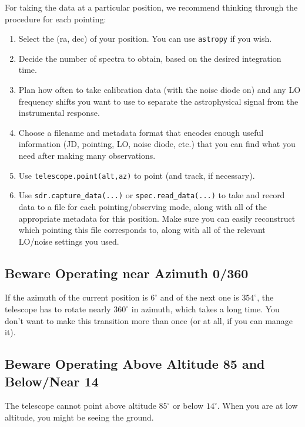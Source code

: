 \documentclass[psfig,preprint]{aastex}
\begin{document}
\noindent
For taking the data at a particular position, we recommend thinking
through the procedure for each pointing:
\begin{enumerate}

\item Select the (ra, dec) of your position. You can use {\tt astropy} if you wish.

\item Decide the number of spectra to obtain, based on the desired integration time.

\item Plan how often to take calibration data (with the noise diode on) and
any LO frequency shifts you want to use to separate the astrophysical
signal from the instrumental response.

\item Choose a filename and metadata format that encodes enough useful information 
(JD, pointing, LO, noise diode,
etc.) that you can find what you need after making many observations.

\item Use {\tt telescope.point(alt,az)} to point (and track, if necessary).

\item Use \texttt{sdr.capture\_data(...)} or \texttt{spec.read\_data(...)} to take and record data to a file for each pointing/observing mode,
along with all of the appropriate metadata for this position. Make sure you can easily reconstruct which pointing this file
corresponds to, along with all of the relevant LO/noise settings you used.

\end{enumerate}


\subsection{Beware Operating near Azimuth 0/360}

\noindent
If the azimuth of the current position is $6^\circ$ and of the next one
is $354^\circ$, the telescope has to rotate nearly $360^\circ$ in azimuth,
which takes a long time. You don't want to make this transition more
than once (or at all, if you can manage it).

\subsection{Beware Operating Above Altitude 85 and Below/Near 14}

\noindent
The telescope cannot point above altitude $85^\circ$ or 
below $14^\circ$. When you are at low altitude, you might be
seeing the ground.
\end{document}
